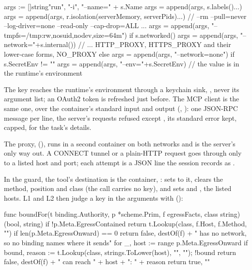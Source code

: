 \begin{go}
args := []string{"run", "-i", "--name=" + s.Name}
args = append(args, s.labels()...)
args = append(args, r.isolation(serverMemory, serverPids)...) // --rm --pull=never --log-driver=none --read-only --cap-drop=ALL ...
args = append(args, "--tmpfs=/tmp:rw,nosuid,nodev,size=64m")
if s.networked() {
    args = append(args, "--network="+s.internal())
    // ... HTTP_PROXY, HTTPS_PROXY and their lower-case forms, NO_PROXY
} else {
    args = append(args, "--network=none")
}
if s.SecretEnv != "" {
    args = append(args, "--env="+s.SecretEnv) // the value is in the runtime's environment
}
\end{go}

The key reaches the runtime's environment through a keychain sink,
, never its argument list; an OAuth2 token is refreshed
just before. The MCP client is the same one, over the container's standard
input and output (, ): one
JSON-RPC message per line, the server's requests refused except
, its standard error kept, capped, for the task's details.

The proxy,  (), runs in
a second container on both networks and is the server's only way out. A
CONNECT tunnel or a plain-HTTP request goes through only to a listed host
and port; each attempt is a JSON line the session records as
.

In the guard, the tool's destination is the container, :
 sets  to it, clears the method, position
and class (the call carries no key), and sets  and
, the listed hosts. L1 and L2 then judge a key in the
arguments with 
():

\begin{go}
func boundFor(t binding.Authority, p *scheme.Prim, f egressFacts, class string) (bool, string) {
    if !p.Meta.EgressContained {
        return t.Lookup(class, f.Host, f.Method, "")
    }
    if len(p.Meta.EgressOnward) == 0 {
        return false, destOf(f) + " has no network, so no binding names where it sends"
    }
    for _, host := range p.Meta.EgressOnward {
        if bound, reason := t.Lookup(class, strings.ToLower(host), "", ""); !bound {
            return false, destOf(f) + " can reach " + host + ": " + reason
        }
    }
    return true, ""
}
\end{go}

